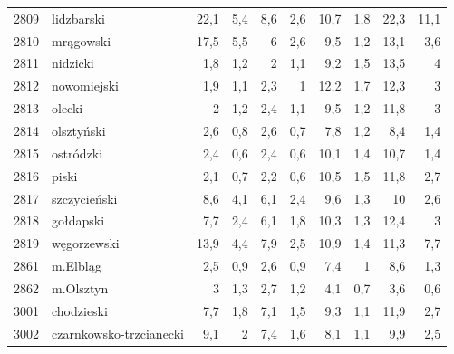 \begin{center}
\begin{longtable}{lp{3cm}rrrrrrrr}
2809 & lidzbarski              & 22,1    & 5,4         & 8,6      & 2,6          & 10,7     & 1,8          & 22,3     & 11,1         \\
2810 & mrągowski               & 17,5    & 5,5         & 6        & 2,6          & 9,5      & 1,2          & 13,1     & 3,6          \\
2811 & nidzicki                & 1,8     & 1,2         & 2        & 1,1          & 9,2      & 1,5          & 13,5     & 4            \\
2812 & nowomiejski             & 1,9     & 1,1         & 2,3      & 1            & 12,2     & 1,7          & 12,3     & 3            \\
2813 & olecki                  & 2       & 1,2         & 2,4      & 1,1          & 9,5      & 1,2          & 11,8     & 3            \\
2814 & olsztyński              & 2,6     & 0,8         & 2,6      & 0,7          & 7,8      & 1,2          & 8,4      & 1,4          \\
2815 & ostródzki               & 2,4     & 0,6         & 2,4      & 0,6          & 10,1     & 1,4          & 10,7     & 1,4          \\
2816 & piski                   & 2,1     & 0,7         & 2,2      & 0,6          & 10,5     & 1,5          & 11,8     & 2,7          \\
2817 & szczycieński            & 8,6     & 4,1         & 6,1      & 2,4          & 9,6      & 1,3          & 10       & 2,6          \\
2818 & gołdapski               & 7,7     & 2,4         & 6,1      & 1,8          & 10,3     & 1,3          & 12,4     & 3            \\
2819 & węgorzewski             & 13,9    & 4,4         & 7,9      & 2,5          & 10,9     & 1,4          & 11,3     & 7,7          \\
2861 & m.Elbląg                & 2,5     & 0,9         & 2,6      & 0,9          & 7,4      & 1            & 8,6      & 1,3          \\
2862 & m.Olsztyn               & 3       & 1,3         & 2,7      & 1,2          & 4,1      & 0,7          & 3,6      & 0,6          \\
3001 & chodzieski              & 7,7     & 1,8         & 7,1      & 1,5          & 9,3      & 1,1          & 11,9     & 2,7          \\
3002 & czarnkowsko-trzcianecki & 9,1     & 2           & 7,4      & 1,6          & 8,1      & 1,1          & 9,9      & 2,5          \\

\end{longtable}
\end{center}
